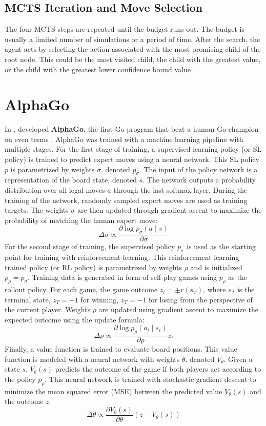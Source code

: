 \subsection{MCTS Iteration and Move Selection}
The four MCTS steps are repeated until the budget runs out.
The budget is usually a limited number of simulations or a period of time.
After the search, the agent acts by selecting the action associated with the most promising child of the root node.
This could be the most visited child, the child with the greatest value, or the child with the greatest lower confidence bound value \cite{FreshMaxLcb_RoyJonathan_2019,AcceleratingSelfPlayLearning_Wu_2020}.

\section{AlphaGo} \label{sec:alpha_go}
In \citeyear{MasteringGameGo_Silver.Schrittwieser.ea_2017},
\citeauthor{MasteringGameGo_Silver.Schrittwieser.ea_2017} developed \textbf{AlphaGo},
the first Go program that beat a human Go champion on even terms \cite{MasteringGameGo_Silver.Schrittwieser.ea_2017}.
AlphaGo was trained with a machine learning pipeline with multiple stages.
For the first stage of training, a supervised learning policy (or SL policy) is trained to predict expert moves using a neural network.
This SL policy $p$ is parametrized by weights $\sigma$, denoted $p_{\sigma}$.
The input of the policy network is a representation of the board state, denoted $s$.
The network outputs a probability distribution over all legal moves $a$ through the last softmax layer.
During the training of the network, randomly sampled expert moves are used as training targets.
The weights $\sigma$ are then updated through gradient ascent to maximize the probability of matching the human expert move:
$$
    \Delta \sigma \propto \frac{\partial \log p_{\sigma}(a \mid s)}{\partial \sigma}
$$
For the second stage of training, the supervised policy $p_{\sigma}$ is used as the starting point for training with reinforcement learning.
This reinforcement learning trained policy (or RL policy) is parametrized by weights $\rho$ and is initialized $p_{\rho} = p_{\sigma}$.
Training data is generated in form of self-play games using $p_{\rho}$ as the rollout policy.
For each game, the game outcome $z_t = \pm r(s_T)$, where $s_T$ is the terminal state, $z_T = +1$ for winning, $z_T = -1$ for losing from the perspective of the current player.
Weights $\rho$ are updated using gradient ascent to maximize the expected outcome using the update formula:
$$
    \Delta \rho \propto \frac{\partial \log p_{\rho}\left(a_{t} \mid s_{t}\right)}{\partial \rho} z_{t}
$$
Finally, a value function is trained to evaluate board positions.
This value function is modeled with a neural network with weights $\theta$, denoted $V_{\theta}$.
Given a state $s$, $V_{\theta}(s)$ predicts the outcome of the game if both players act according to the policy $p_{\rho}$.
This neural network is trained with stochastic gradient descent to minimize the mean squared error (MSE) between the predicted value $V_{\theta}(s)$ and the outcome $z$.
$$
    \Delta \theta \propto \frac{\partial V_{\theta}(s)}{\partial \theta}\left(z-V_{\theta}(s)\right)
$$

